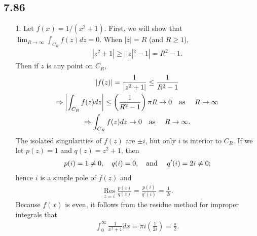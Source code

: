 \documentclass[a4paper,12pt]{article}
\begin{document}
\subsection*{7.86}
\begin{enumerate}
    \item[1.]
        Let $f(x) = 1/(x^2 + 1)$. First, we will show that $\lim_{R \to \infty} \int_{C_R} f(z) dz = 0$. When $|z| = R$ (and $R \geq 1$),
        \begin{gather*}
            |z^2 + 1| \geq ||z|^2 - 1| = R^2 - 1.
        \end{gather*}
        Then if $z$ is any point on $C_R$,
        \begin{gather*}
            |f(z)| = \frac{1}{|z^2 + 1|} \leq \frac{1}{R^2 - 1} \\
            \Rightarrow \left| \int_{C_R} f(z) dz \right| \leq \left( \frac{1}{R^2 - 1} \right) \pi R \to 0 \text{\quad as \quad} R \to \infty \\
            \Rightarrow \int_{C_R} f(z) dz \to 0 \text{\quad as \quad} R \to \infty.
        \end{gather*}
        The isolated singularities of $f(z)$ are $\pm i$, but only $i$ is interior to $C_R$. If we let $p(z) = 1$ and $q(z) = z^2 + 1$, then
        \begin{align*}
            p(i) = 1 \neq 0, \quad q(i) = 0, \text{\quad and \quad} q'(i) = 2i \neq 0;
        \end{align*}
        hence $i$ is a simple pole of $f(z)$ and
        \begin{align*}
            \underset{z = i}{\text{\ Res\ }} \frac{p(z)}{q(z)} = \frac{p(i)}{q'(i)} = \frac{1}{2i}.
        \end{align*}
        Because $f(x)$ is even, it follows from the residue method for improper integrals that
        \begin{align*}
            \int_0^\infty \frac{1}{x^2 + 1} dx = \pi i \left( \frac{1}{2i} \right) = \frac{\pi}{2}.
        \end{align*}


\end{enumerate}
\end{document}
